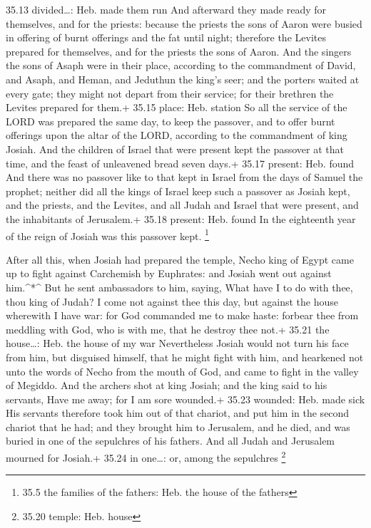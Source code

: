 35.13 divided\ldots: Heb. made them run  And afterward they
made ready for themselves, and for the priests: because the priests the
sons of Aaron were busied in offering of burnt offerings and the fat
until night; therefore the Levites prepared for themselves, and for the
priests the sons of Aaron.  And the singers the sons of
Asaph were in their place, according to the commandment of David, and
Asaph, and Heman, and Jeduthun the king's seer; and the porters waited
at every gate; they might not depart from their service; for their
brethren the Levites prepared for them.+ 35.15 place: Heb. station
 So all the service of the LORD was prepared the same day,
to keep the passover, and to offer burnt offerings upon the altar of the
LORD, according to the commandment of king Josiah.  And the
children of Israel that were present kept the passover at that time, and
the feast of unleavened bread seven days.+ 35.17 present: Heb. found
 And there was no passover like to that kept in Israel from
the days of Samuel the prophet; neither did all the kings of Israel keep
such a passover as Josiah kept, and the priests, and the Levites, and
all Judah and Israel that were present, and the inhabitants of
Jerusalem.+ 35.18 present: Heb. found  In the eighteenth
year of the reign of Josiah was this passover kept. \footnote{35.5 the
  families of the fathers: Heb. the house of the fathers}

 After all this, when Josiah had prepared the temple, Necho
king of Egypt came up to fight against Carchemish by Euphrates: and
Josiah went out against him.\^{}*\^{}  But he sent
ambassadors to him, saying, What have I to do with thee, thou king of
Judah? I come not against thee this day, but against the house wherewith
I have war: for God commanded me to make haste: forbear thee from
meddling with God, who is with me, that he destroy thee not.+ 35.21 the
house\ldots: Heb. the house of my war  Nevertheless Josiah
would not turn his face from him, but disguised himself, that he might
fight with him, and hearkened not unto the words of Necho from the mouth
of God, and came to fight in the valley of Megiddo.  And
the archers shot at king Josiah; and the king said to his servants, Have
me away; for I am sore wounded.+ 35.23 wounded: Heb. made sick
 His servants therefore took him out of that chariot, and
put him in the second chariot that he had; and they brought him to
Jerusalem, and he died, and was buried in one of the sepulchres of his
fathers. And all Judah and Jerusalem mourned for Josiah.+ 35.24 in
one\ldots: or, among the sepulchres \footnote{35.20 temple: Heb. house}

